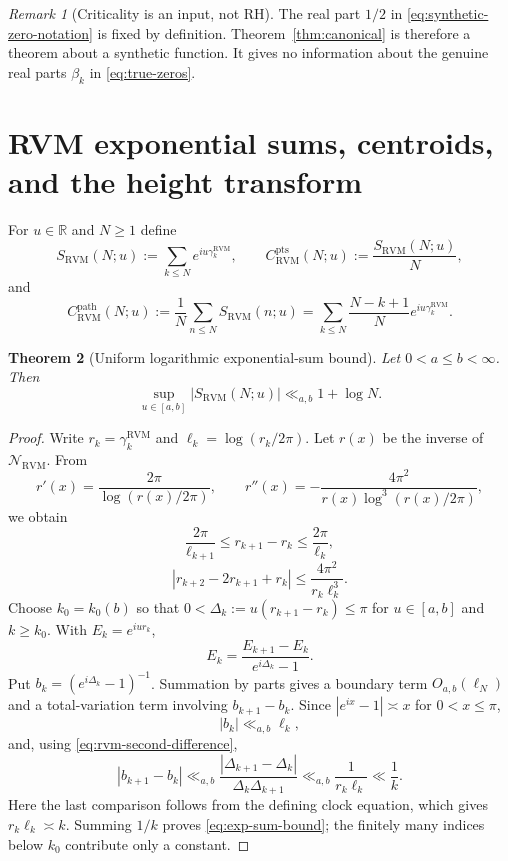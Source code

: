 \documentclass[11pt,reqno]{amsart}
\newtheorem{theorem}{Theorem}[section]
\theoremstyle{definition}
\theoremstyle{remark}
\newtheorem{remark}[theorem]{Remark}
\newcommand{\R}{\mathbb R}
\newcommand{\RVM}{\mathrm{RVM}}
\newcommand{\pts}{\mathrm{pts}}
\newcommand{\pathc}{\mathrm{path}}
\begin{document}
\begin{remark}[Criticality is an input, not RH]\label{rem:not-rh}
The real part $1/2$ in \eqref{eq:synthetic-zero-notation} is fixed by definition.  Theorem~\ref{thm:canonical} is therefore a theorem about a synthetic function.  It gives no information about the genuine real parts $\beta_k$ in \eqref{eq:true-zeros}.
\end{remark}

\section{RVM exponential sums, centroids, and the height transform}

For $u\in\R$ and $N\ge1$ define
\begin{equation}\label{eq:S-RVM}
 S_{\RVM}(N;u):=\sum_{k\le N}e^{iu\gamma_k^{\RVM}},
 \qquad
 C_{\RVM}^{\pts}(N;u):=\frac{S_{\RVM}(N;u)}{N},
\end{equation}
and
\begin{equation}\label{eq:path-centroid}
 C_{\RVM}^{\pathc}(N;u)
 :=\frac1N\sum_{n\le N}S_{\RVM}(n;u)
 =\sum_{k\le N}\frac{N-k+1}{N}e^{iu\gamma_k^{\RVM}}.
\end{equation}

\begin{theorem}[Uniform logarithmic exponential-sum bound]\label{thm:exp-sum}
Let $0<a\le b<\infty$.  Then
\begin{equation}\label{eq:exp-sum-bound}
 \boxed{
 \sup_{u\in[a,b]}|S_{\RVM}(N;u)|\ll_{a,b}1+\log N.}
\end{equation}
\end{theorem}

\begin{proof}
Write $r_k=\gamma_k^{\RVM}$ and $\ell_k=\log(r_k/2\pi)$.  Let $r(x)$ be the inverse of $\mathcal N_{\RVM}$.  From
\[
 r'(x)=\frac{2\pi}{\log(r(x)/2\pi)},
 \qquad
 r''(x)=-\frac{4\pi^2}{r(x)\log^3(r(x)/2\pi)},
\]
we obtain
\begin{equation}\label{eq:rvm-gap-bounds}
 \frac{2\pi}{\ell_{k+1}}
 \le r_{k+1}-r_k
 \le\frac{2\pi}{\ell_k},
\end{equation}
\begin{equation}\label{eq:rvm-second-difference}
 |r_{k+2}-2r_{k+1}+r_k|
 \le\frac{4\pi^2}{r_k\ell_k^3}.
\end{equation}
Choose $k_0=k_0(b)$ so that
$0<\Delta_k:=u(r_{k+1}-r_k)\le\pi$ for $u\in[a,b]$ and $k\ge k_0$.  With $E_k=e^{iur_k}$,
\[
 E_k=\frac{E_{k+1}-E_k}{e^{i\Delta_k}-1}.
\]
Put $b_k=(e^{i\Delta_k}-1)^{-1}$.  Summation by parts gives a boundary term $O_{a,b}(\ell_N)$ and a total-variation term involving $b_{k+1}-b_k$.  Since $|e^{ix}-1|\asymp x$ for $0<x\le\pi$,
\[
 |b_k|\ll_{a,b}\ell_k,
\]
and, using \eqref{eq:rvm-second-difference},
\[
 |b_{k+1}-b_k|
 \ll_{a,b}
 \frac{|\Delta_{k+1}-\Delta_k|}{\Delta_k\Delta_{k+1}}
 \ll_{a,b}\frac1{r_k\ell_k}
 \ll\frac1k.
\]
Here the last comparison follows from the defining clock equation, which gives $r_k\ell_k\asymp k$.  Summing $1/k$ proves \eqref{eq:exp-sum-bound}; the finitely many indices below $k_0$ contribute only a constant.
\end{proof}
\end{document}
